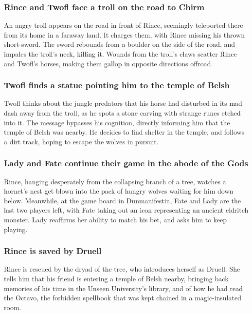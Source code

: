 \subsubsection{\Gls{Rince} and \Gls{Twofl} face a troll on the road to Chirm}
An angry troll appears on the road in front of \Gls{Rince}, seemingly teleported there from its
home in a faraway land. It charges them, with \Gls{Rince} missing his thrown short-sword. The
sword rebounds from a boulder on the side of the road, and impales the troll's neck, killing it.
Wounds from the troll's claws scatter \Gls{Rince} and \Gls{Twofl}'s horses, making them gallop in
opposite directions offroad.

\subsubsection{\Gls{Twofl} finds a statue pointing him to the temple of \Gls{Belsh}}
\Gls{Twofl} thinks about the jungle predators that his horse had disturbed in its mad dash away
from the troll, as he spots a stone carving with strange runes etched into it. The message bypasses
his cognition, directly informing him that the temple of \Gls{Belsh} was nearby. He decides to find
shelter in the temple, and follows a dirt track, hoping to escape the wolves in pursuit.

\subsubsection{\Gls{Lady} and \Gls{Fate} continue their game in the abode of the Gods}
\Gls{Rince}, hanging desperately from the collapsing branch of a tree, watches a hornet's nest get
blown into the pack of hungry wolves waiting for him down below. Meanwhile, at the game board in
Dunmanifestin, \Gls{Fate} and \Gls{Lady} are the last two players left, with \Gls{Fate} taking out
an icon representing an ancient eldritch monster. \Gls{Lady} reaffirms her ability to match his
bet, and asks him to keep playing.

\subsubsection{\Gls{Rince} is saved by \Gls{Druell}}
\Gls{Rince} is rescued by the dryad of the tree, who introduces herself as \Gls{Druell}. She tells
him that his friend is entering a temple of \Gls{Belsh} nearby, bringing back memories of his time
in the Unseen University's library, and of how he had read the Octavo, the forbidden spellbook that
was kept chained in a magic-insulated room.

